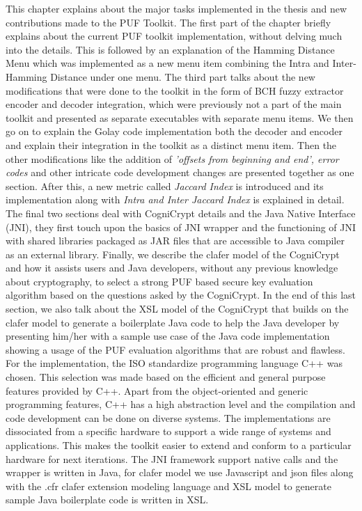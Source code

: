 This chapter explains about the major tasks implemented in the thesis and new contributions made to the PUF Toolkit. The first part of the chapter briefly explains about the current PUF toolkit implementation, without delving much into the details. This is followed by an explanation of the Hamming Distance Menu which was implemented as a new menu item combining the Intra and Inter-Hamming Distance under one menu. The third part talks about the new modifications that were done to the toolkit in the form of BCH fuzzy extractor encoder and decoder integration, which were previously not a part of the main toolkit and presented as separate executables
with separate menu items. We then go on to explain the Golay code implementation both the decoder and encoder and explain their integration in the toolkit as a distinct menu item. Then the other modifications like the addition of \emph{'offsets from beginning and end', error codes} and other intricate code development changes are presented together as one section. After this, a new metric called \emph{Jaccard Index} is introduced and its implementation along with \emph{Intra and Inter
Jaccard Index} is explained in detail.\\

The final two sections deal with CogniCrypt details and the Java Native Interface (JNI), they first touch upon the basics of JNI
wrapper and the functioning of JNI with shared libraries packaged as JAR files that are accessible to Java compiler as an external library. Finally, we describe the clafer model of the CogniCrypt and how it assists users and Java developers, without any previous knowledge about cryptography, to select a strong PUF based secure key evaluation algorithm based on the questions asked by the CogniCrypt. In the end of this last section, we also talk about the XSL model of the CogniCrypt that builds on
the clafer model to generate a boilerplate Java code to help the Java developer by presenting him/her with a sample use case of the Java code implementation showing a usage of the PUF evaluation algorithms that are robust and flawless.\\

For the implementation, the ISO standardize programming language C++ was chosen. This selection was made based on the efficient and general purpose features provided by C++. Apart from the object-oriented and generic programming features, C++ has a high abstraction level and the compilation and code development can be done on diverse systems. The implementations are dissociated from a specific hardware to support a wide range of systems and applications. This makes the toolkit easier
to extend and conform to a particular hardware for next iterations. The JNI framework support native calls and the wrapper is written in Java, for clafer model we use Javascript and json files along with the .cfr clafer extension modeling language \cite{clafer} and XSL model to generate sample Java boilerplate code is written in XSL.\\

